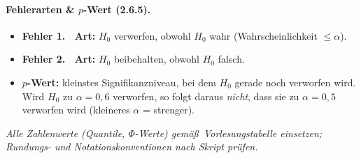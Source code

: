 \paragraph{Fehlerarten \& $p$-Wert (2.6.5). }
\begin{itemize}
    \item \textbf{Fehler 1. \ Art:} $H_0$ verwerfen, obwohl $H_0$ wahr
    (Wahrscheinlichkeit $\leq\alpha$). 
    \item \textbf{Fehler 2. \ Art:} $H_0$ beibehalten, obwohl $H_0$ falsch. 
    \item \textbf{$p$-Wert:} kleinstes Signifikanzniveau, bei dem $H_0$ gerade noch
    verworfen wird. Wird $H_0$ zu $\alpha=0{,}6$ verworfen, so folgt daraus
    \emph{nicht}, dass sie zu $\alpha=0{,}5$ verworfen wird (kleineres $\alpha$
    = strenger). 
\end{itemize}

\begin{mytable}
    \itshape
    Alle Zahlenwerte (Quantile, $\Phi$-Werte) gemäß\ Vorlesungstabelle einsetzen;
    Rundungs- und Notationskonventionen nach Skript prüfen. 
\end{mytable}

